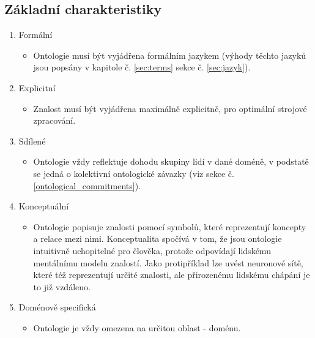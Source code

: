 \subsection{Základní charakteristiky}
\begin{enumerate}
\item Formální
\begin{itemize}
\item Ontologie musí být vyjádřena formálním jazykem (výhody těchto jazyků jsou popsány v kapitole č. \ref{sec:terms} sekce č. \ref{sec:jazyk}).
\end{itemize}
\item Explicitní
\begin{itemize}
\item Znalost musí být vyjádřena maximálně explicitně, pro optimální strojové zpracování.
\end{itemize}
\item Sdílené
\begin{itemize}
\item Ontologie vždy reflektuje dohodu skupiny lidí v dané doméně, v podstatě se jedná o kolektivní ontologické závazky (viz sekce č. \ref{ontological_commitments}).
\end{itemize}
\item Konceptuální
\begin{itemize}
\item Ontologie popisuje znalosti pomocí symbolů, které reprezentují koncepty a relace mezi nimi. Konceptualita spočívá v tom, že jsou ontologie intuitivně uchopitelné pro člověka, protože odpovídají lidskému mentálnímu modelu znalostí. Jako protipříklad lze uvést neuronové sítě, které též reprezentují určité znalosti, ale přirozenému lidskému chápání je to již vzdáleno.
\end{itemize}
\item Doménově specifická
\begin{itemize}
\item Ontologie je vždy omezena na určitou oblast - doménu.\cite{Stephan2007}
\end{itemize}
\end{enumerate}



